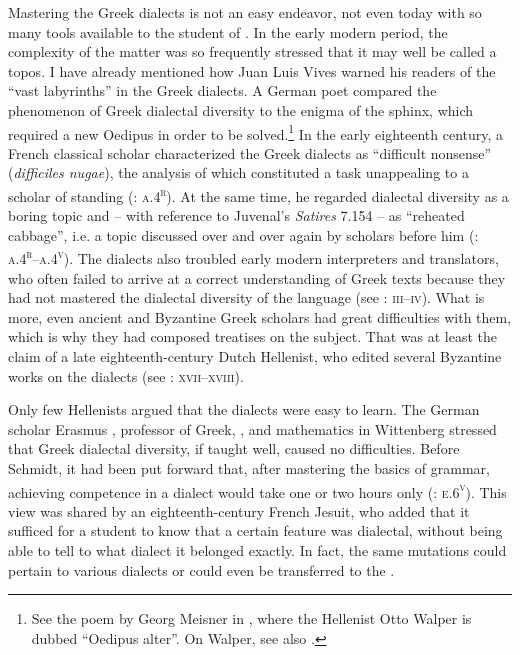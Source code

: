 Mastering the Greek dialects is not an easy endeavor, not even today with so many tools available to the student of . In the early modern period, the complexity of the matter was so frequently stressed that it may well be called a topos. I have already mentioned how Juan Luis Vives warned his readers of the “vast labyrinths” in the Greek dialects. A German poet compared the phenomenon of Greek dialectal diversity to the enigma of the sphinx, which required a new Oedipus in order to be solved.\footnote{See the poem by Georg Meisner in \citet[††.2\textsc{\textsuperscript{r}}]{Walper1589}, where the Hellenist Otto Walper is dubbed “Oedipus alter”. On Walper, see also \citet[]{VanRooyFcc}.} In the early eighteenth century, a French classical scholar characterized the Greek dialects as “difficult nonsense” (\textit{difficiles nugae}), the analysis of which constituted a task unappealing to a scholar of standing (\citealt{Maittaire1706}: \textsc{a.4}\textsc{\textsuperscript{r}}). At the same time, he regarded dialectal diversity as a boring topic and – with reference to Juvenal’s \textit{Satires} 7.154 – as “reheated cabbage”, i.e. a topic discussed over and over again by scholars before him (\citealt{Maittaire1706}: \textsc{a.4}\textsc{\textsuperscript{r}}--\textsc{a.4}\textsc{\textsuperscript{v}}). The dialects also troubled early modern interpreters and translators, who often failed to arrive at a correct understanding of Greek texts because they had not mastered the dialectal diversity of the language (see \citealt{Facius1782}: \textsc{iii–iv}). What is more, even ancient and Byzantine Greek scholars had great difficulties with them, which is why they had composed treatises on the subject. That was at least the claim of a late eighteenth-century Dutch Hellenist, who edited several Byzantine works on the dialects (see \citealt{Koen1766}: \textsc{xvii–xviii}).

Only few Hellenists argued that the dialects were easy to learn. The German scholar Erasmus \citet[):(.2\textsc{\textsuperscript{r}}]{Schmidt1604}, professor of Greek, , and mathematics in Wittenberg stressed that Greek dialectal diversity, if taught well, caused no difficulties. Before Schmidt, it had been put forward that, after mastering the basics of grammar, achieving competence in a dialect would take one or two hours only (\citealt{Caselius1560}: \textsc{e.6}\textsc{\textsuperscript{v}}). This view was shared by an eighteenth-century French Jesuit, who added that it sufficed for a student to know that a certain feature was dialectal, without being able to tell to what dialect it belonged exactly. In fact, the same mutations could pertain to various dialects or could even be transferred to the  \citep[101]{Giraudeau1739}.

